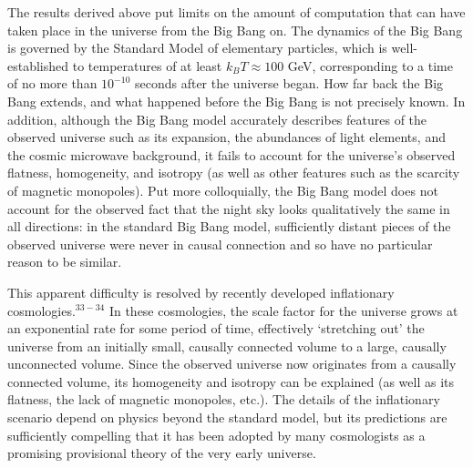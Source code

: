 \bigskip{}

The results derived above put limits on the amount of computation 
that can have taken place in the universe from the Big Bang on.  The
dynamics of the Big Bang is governed by the Standard Model of elementary
particles, which is well-established to temperatures of at least
$k_B T \approx 100$ GeV, corresponding to a time of no more than $10^{-10}$
seconds after the universe began.  How far back the Big Bang extends,
and what happened before the Big Bang is not precisely known.  In
addition, although the Big Bang model accurately describes features
of the observed universe such as its expansion, the abundances of light
elements, and the cosmic microwave background, it fails to account for
the universe's observed flatness, homogeneity, and isotropy (as well as 
other features such as the scarcity of magnetic monopoles).  
Put more colloquially, the Big Bang model does not account for the
observed fact that the night sky looks qualitatively the same in
all directions: in the standard Big Bang model, sufficiently distant
pieces of the observed universe were never in causal connection and
so have no particular reason to be similar.

This apparent difficulty is resolved by recently developed 
inflationary cosmologies.$^{33-34}$  In these cosmologies, the scale factor
for the universe grows at an exponential rate for some period
of time, effectively `stretching out' the universe from an
initially small, causally connected volume to a large, causally
unconnected volume.  Since the observed universe now originates
from a causally connected volume, its homogeneity and isotropy
can be explained (as well as its flatness, the lack of magnetic
monopoles, etc.).  The details of the inflationary scenario depend on physics 
beyond the standard model, but its predictions are sufficiently compelling
that it has been adopted by many cosmologists as a promising
provisional theory of the very early universe.

